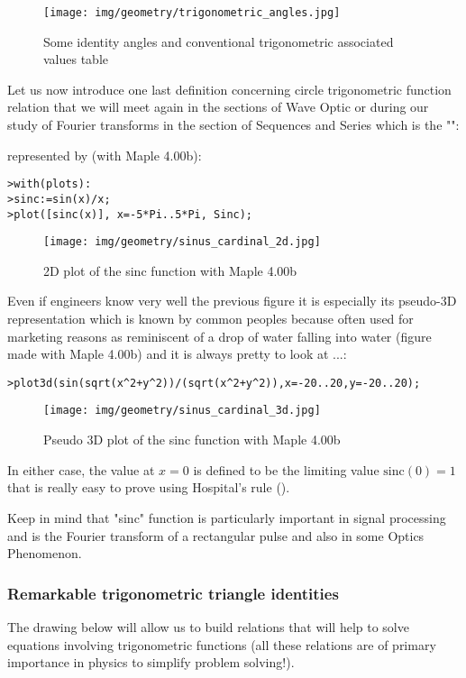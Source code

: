 	\begin{figure}[H]
		\centering
		\texttt{[image: img/geometry/trigonometric\_angles.jpg]}
		\caption{Some identity angles and conventional trigonometric associated values table}
	\end{figure}
	Let us now introduce one last definition concerning circle trigonometric function relation that we will meet again in the sections of Wave Optic or during our study of Fourier transforms in the section of Sequences and Series which is the "\label{sinc cardinal}":
	
	represented by (with Maple 4.00b):
	
	\texttt{>with(plots):\\
	>sinc:=sin(x)/x;\\
	>plot([sinc(x)], x=-5*Pi..5*Pi, Sinc);}
	\begin{figure}[H]
		\centering
		\texttt{[image: img/geometry/sinus\_cardinal\_2d.jpg]}
		\caption{2D plot of the sinc function with Maple 4.00b}
	\end{figure}
	Even if engineers know very well the previous figure it is especially its pseudo-3D representation which is known by common peoples because often used for marketing reasons as reminiscent of a drop of water falling into water (figure made with Maple 4.00b) and it is always pretty to look at ...:

\texttt{>plot3d(sin(sqrt(x\string^2+y\string^2))/(sqrt(x\string^2+y\string^2)),x=-20..20,y=-20..20);}

\begin{figure}[H]
\centering
\texttt{[image: img/geometry/sinus\_cardinal\_3d.jpg]}
\caption{Pseudo 3D plot of the sinc function with Maple 4.00b}
\end{figure}
In either case, the value at $x = 0$ is defined to be the limiting value $\mathrm{sinc(0)} = 1$ that is really easy to prove using Hospital's rule ().

Keep in mind that "sinc" function is particularly important in signal processing and is the Fourier transform of a rectangular pulse and also in some Optics Phenomenon.

	\subsubsection{Remarkable trigonometric triangle identities}\label{remarkable trigonometric identities}
	The drawing below will allow us to build relations that will help to solve equations involving trigonometric functions (all these relations are of primary importance in physics to simplify problem solving!).

